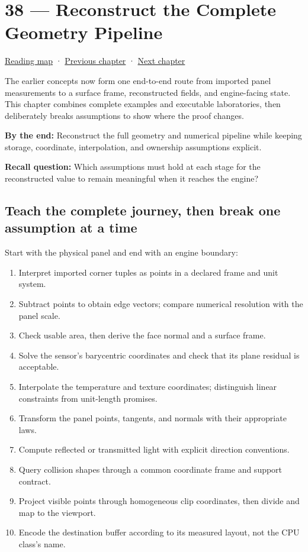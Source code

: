 \hypertarget{02-foundations-ii-ch038}{}
\chapter{38 --- Reconstruct the Complete Geometry Pipeline}\label{02-foundations-ii-ch038-reconstruct-the-complete-geometry-pipeline}

\hyperref[volume-reading-map]{Reading map} · \hyperref[02-foundations-ii-ch037]{Previous chapter} · \hyperref[02-foundations-ii-ch039]{Next chapter}

The earlier concepts now form one end-to-end route from imported panel measurements to a surface frame, reconstructed fields, and engine-facing state. This chapter combines complete examples and executable laboratories, then deliberately breaks assumptions to show where the proof changes.

\textbf{By the end:} Reconstruct the full geometry and numerical pipeline while keeping storage, coordinate, interpolation, and ownership assumptions explicit.

\textbf{Recall question:} Which assumptions must hold at each stage for the reconstructed value to remain meaningful when it reaches the engine?

\section{Teach the complete journey, then break one assumption at a time}\label{02-foundations-ii-ch038-teach-the-complete-journey-then-break-one-assumption-at-a-time}

Start with the physical panel and end with an engine boundary:

\begin{enumerate}
\def\labelenumi{\arabic{enumi}.}
\tightlist
\item
  Interpret imported corner tuples as points in a declared frame and unit system.
\item
  Subtract points to obtain edge vectors; compare numerical resolution with the panel scale.
\item
  Check usable area, then derive the face normal and a surface frame.
\item
  Solve the sensor's barycentric coordinates and check that its plane residual is acceptable.
\item
  Interpolate the temperature and texture coordinates; distinguish linear constraints from unit-length promises.
\item
  Transform the panel points, tangents, and normals with their appropriate laws.
\item
  Compute reflected or transmitted light with explicit direction conventions.
\item
  Query collision shapes through a common coordinate frame and support contract.
\item
  Project visible points through homogeneous clip coordinates, then divide and map to the viewport.
\item
  Encode the destination buffer according to its measured layout, not the CPU class's name.
\end{enumerate}

